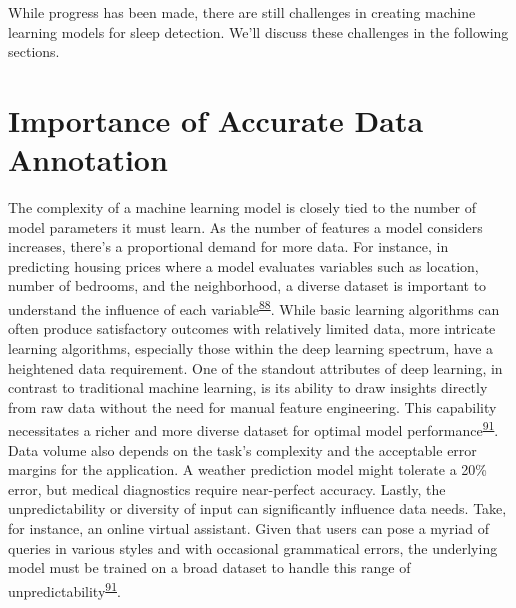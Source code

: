 \documentclass[
  10pt,
]{scrbook}
\begin{document}
While progress has been made, there are still challenges in creating
machine learning models for sleep detection. We'll discuss these
challenges in the following sections.

\hypertarget{importance-of-accurate-data-annotation}{%
\section{Importance of Accurate Data
Annotation}\label{importance-of-accurate-data-annotation}}

The complexity of a machine learning model is closely tied to the number
of model parameters it must learn. As the number of features a model
considers increases, there's a proportional demand for more data. For
instance, in predicting housing prices where a model evaluates variables
such as location, number of bedrooms, and the neighborhood, a diverse
dataset is important to understand the influence of each
variable\textsuperscript{\protect\hyperlink{ref-hastie01statisticallearning}{88}}.
While basic learning algorithms can often produce satisfactory outcomes
with relatively limited data, more intricate learning algorithms,
especially those within the deep learning spectrum, have a heightened
data requirement. One of the standout attributes of deep learning, in
contrast to traditional machine learning, is its ability to draw
insights directly from raw data without the need for manual feature
engineering. This capability necessitates a richer and more diverse
dataset for optimal model
performance\textsuperscript{\protect\hyperlink{ref-Goodfellow-et-al-2016}{91}}.
Data volume also depends on the task's complexity and the acceptable
error margins for the application. A weather prediction model might
tolerate a 20\% error, but medical diagnostics require near-perfect
accuracy. Lastly, the unpredictability or diversity of input can
significantly influence data needs. Take, for instance, an online
virtual assistant. Given that users can pose a myriad of queries in
various styles and with occasional grammatical errors, the underlying
model must be trained on a broad dataset to handle this range of
unpredictability\textsuperscript{\protect\hyperlink{ref-Goodfellow-et-al-2016}{91}}.
\end{document}
